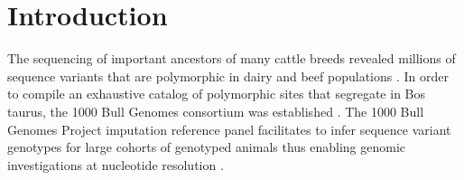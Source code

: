 \documentclass[../main.tex]{subfiles}
\begin{document}
\newpage

\section{Introduction}

\doublespacing 
\normalsize
The sequencing of important ancestors of many cattle breeds revealed millions of sequence variants that are polymorphic in dairy and beef populations \citep{Hoff2017,Stothard2015,Boussaha2016,Jansen2013}. In order to compile an exhaustive catalog of polymorphic sites that segregate in Bos taurus, the 1000 Bull Genomes consortium was established \citep{Daetwyler2014,Hayes2019}. 
The 1000 Bull Genomes Project imputation reference panel facilitates to infer sequence variant genotypes for large cohorts of genotyped animals thus enabling genomic investigations at nucleotide resolution \citep{Daetwyler2014,Pausch2017,Bouwman2018,Raymond2018}.
\end{document}
